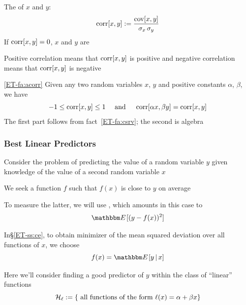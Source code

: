 \begin{frame}

    \vspace{2em}
    The  of $x$ and $y$:
    \begin{equation*}
        \operatorname{corr}[x,y] := \frac{\operatorname{cov}[x,y]}{\sigma_x \, \sigma_y}
    \end{equation*}
    If $\operatorname{corr}[x,y] = 0$,  $x$ and $y$ are 
    
    Positive correlation means that $\operatorname{corr}[x,y]$ is positive and negative
    correlation means that $\operatorname{corr}[x,y]$ is negative

    \Fact\eqref{ET-fa:acorr}
        Given any two random variables $x$, $y$ and positive constants $\alpha$,
        $\beta$, we have 
        \begin{equation*}
            -1 \leq \operatorname{corr}[x,y] \leq 1 
            \quad \text{ and }\quad  
            \operatorname{corr}[\alpha x, \beta y] = \operatorname{corr}[x,y]
        \end{equation*}
    The first part follows from fact~\ref{ET-fa:csrv}; the second is 
    algebra
    
\end{frame}

\begin{frame}

    \vspace{2em}
    \frametitle{Best Linear Predictors}
    Consider the problem of predicting the value of a random variable $y$
    given knowledge of the value of a second random variable $x$ 
    
    We seek a
    function $f$ such that $f(x)$ is close to $y$ on average
    
    To measure the
    latter, we will use , which amounts in this case to  
    \begin{equation*}
        \EE [ (y - f(x))^2 ]
    \end{equation*}
    
\end{frame}

\begin{frame}

    \vspace{2em}
    In\S\ref{ET-ss:ce}, to obtain minimizer of the mean squared
    deviation over all functions of $x$, we choose 
    $$f(x) = \EE[y \given
    x]$$
    
    \vspace{.7em}
    Here we'll consider finding a good predictor of $y$ within 
    the class of ``linear'' functions
    \begin{equation*}
        \label{eq:llrv}
        \mathcal{H}_{\ell} := \{ \text{ all functions of the form } \ell(x) = \alpha + \beta x \}
    \end{equation*}
    
\end{frame}

